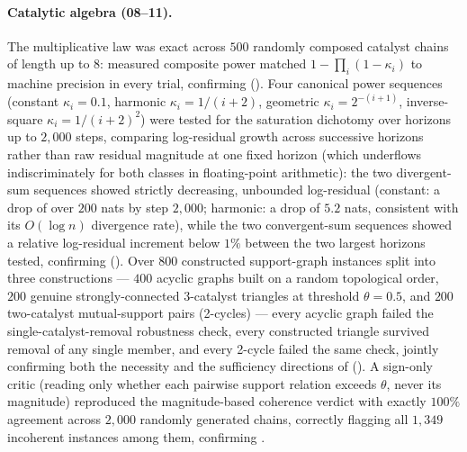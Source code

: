 \documentclass[11pt,twocolumn,a4paper]{article}
\theoremstyle{thmstyle}
\theoremstyle{definition}
\theoremstyle{remark}
\newcommand{\pot}{\kappa}
\begin{document}
\paragraph{Catalytic algebra (08--11).}
The multiplicative law was exact across $500$ randomly composed catalyst
chains of length up to $8$: measured composite power matched
$1-\prod_i(1-\pot_i)$ to machine precision in every trial, confirming
 (). Four
canonical power sequences (constant $\pot_i=0.1$, harmonic
$\pot_i=1/(i+2)$, geometric $\pot_i=2^{-(i+1)}$, inverse-square
$\pot_i=1/(i+2)^2$) were tested for the saturation dichotomy over horizons
up to $2{,}000$ steps, comparing log-residual growth across successive
horizons rather than raw residual magnitude at one fixed horizon (which
underflows indiscriminately for both classes in floating-point
arithmetic): the two divergent-sum sequences showed strictly decreasing,
unbounded log-residual (constant: a drop of over $200$ nats by step
$2{,}000$; harmonic: a drop of $5.2$ nats, consistent with its
$O(\log n)$ divergence rate), while the two convergent-sum sequences
showed a relative log-residual increment below $1\%$ between the two
largest horizons tested, confirming 
(). Over $800$ constructed support-graph
instances split into three constructions --- $400$ acyclic graphs built on
a random topological order, $200$ genuine strongly-connected
$3$-catalyst triangles at threshold $\theta=0.5$, and $200$ two-catalyst
mutual-support pairs (2-cycles) --- every acyclic graph failed the
single-catalyst-removal robustness check, every constructed triangle
survived removal of any single member, and every 2-cycle failed the same
check, jointly confirming both the necessity and the sufficiency
directions of  (). A
sign-only critic (reading only whether each pairwise support relation
exceeds $\theta$, never its magnitude) reproduced the magnitude-based
coherence verdict with exactly $100\%$ agreement across $2{,}000$ randomly
generated chains, correctly flagging all $1{,}349$ incoherent instances
among them, confirming .
\end{document}
